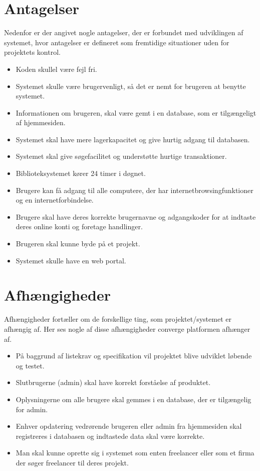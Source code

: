 

\chapter{Antagelser}
Nedenfor er der angivet nogle antagelser, der er forbundet med udviklingen af systemet, hvor antagelser er defineret som fremtidige situationer uden for projektets kontrol. 

\begin{itemize}
    \item Koden skullel være fejl fri.
    \item Systemet skulle være brugervenligt, så det er nemt for brugeren at benytte systemet.
    \item Informationen om brugeren, skal være gemt i en database, som er tilgængeligt af hjemmesiden.
    \item Systemet skal have mere lagerkapacitet og give hurtig adgang til databasen.
    \item Systemet skal give søgefacilitet og understøtte hurtige transaktioner.
    \item Biblioteksystemet kører 24 timer i døgnet.
    \item Brugere kan få adgang til alle computere, der har internetbrowsingfunktioner og en internetforbindelse.
    \item Brugere skal have deres korrekte brugernavne og adgangskoder for at indtaste deres online konti og foretage handlinger.
    \item Brugeren skal kunne byde på et projekt.
    \item Systemet skulle have en web portal.
     
  
\end{itemize}

\chapter{Afhængigheder}

Afhængigheder fortæller om de forskellige ting, som projektet/systemet er afhængig af. Her ses nogle af disse afhængigheder converge platformen afhænger af.

\begin{itemize}
    
    \item På baggrund af listekrav og specifikation vil projektet blive udviklet løbende og testet.
    \item Slutbrugerne (admin) skal have korrekt forståelse af produktet.
    \item  Oplysningerne om alle brugere skal gemmes i en database, der er tilgængelig for admin.
    \item Enhver opdatering vedrørende brugeren eller admin fra hjemmesiden skal registreres i databasen og indtastede data skal være korrekte.
    \item Man skal kunne oprette sig i systemet som enten freelancer eller som et firma der søger freelancer til deres projekt.

\end{itemize}



